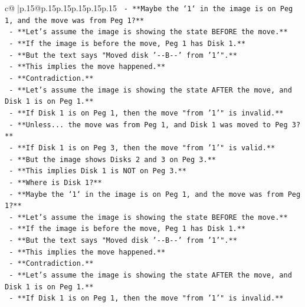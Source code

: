 \documentclass{article}
\begin{document}
{\begin{supertabular}{c@{$\;$}|p{.15\linewidth}@{}p{.15\linewidth}p{.15\linewidth}p{.15\linewidth}p{.15\linewidth}p{.15\linewidth}}
{{{\texttt{              {-} **Maybe the `1` in the image is on Peg 1, and the move was from Peg 1?**} \\
\texttt{              {-} **Let's assume the image is showing the state BEFORE the move.**} \\
\texttt{              {-} **If the image is before the move, Peg 1 has Disk 1.**} \\
\texttt{              {-} **But the text says "Moved disk '{-}{-}B{-}{-}' from '1'".**} \\
\texttt{              {-} **This implies the move happened.**} \\
\texttt{              {-} **Contradiction.**} \\
\texttt{              {-} **Let's assume the image is showing the state AFTER the move, and Disk 1 is on Peg 1.**} \\
\texttt{              {-} **If Disk 1 is on Peg 1, then the move "from '1'" is invalid.**} \\
\texttt{              {-} **Unless... the move was from Peg 1, and Disk 1 was moved to Peg 3?**} \\
\texttt{              {-} **If Disk 1 is on Peg 3, then the move "from '1'" is valid.**} \\
\texttt{              {-} **But the image shows Disks 2 and 3 on Peg 3.**} \\
\texttt{              {-} **This implies Disk 1 is NOT on Peg 3.**} \\
\texttt{              {-} **Where is Disk 1?**} \\
\texttt{              {-} **Maybe the `1` in the image is on Peg 1, and the move was from Peg 1?**} \\
\texttt{              {-} **Let's assume the image is showing the state BEFORE the move.**} \\
\texttt{              {-} **If the image is before the move, Peg 1 has Disk 1.**} \\
\texttt{              {-} **But the text says "Moved disk '{-}{-}B{-}{-}' from '1'".**} \\
\texttt{              {-} **This implies the move happened.**} \\
\texttt{              {-} **Contradiction.**} \\
\texttt{              {-} **Let's assume the image is showing the state AFTER the move, and Disk 1 is on Peg 1.**} \\
\texttt{              {-} **If Disk 1 is on Peg 1, then the move "from '1'" is invalid.**} \\
}}}
\end{supertabular}}
\end{document}
